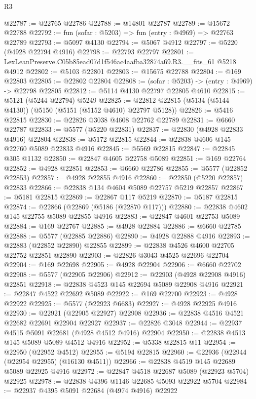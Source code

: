 \begin{lexlean}{R3}
\begin{coremodule}
@22787 := @22765 @22786
@22788 := @14801 @22787
@22789 := @15672 @22788
@22792 := fun (sofar : @5203) => fun (entry : @4969) => @22763 @22789
@22793 := @5097 @4130
@22794 := @5067 @4912
@22797 := @5220 (@4928 @22794 @4916)
@22798 := @22793 @22797
@22801 := LexLeanPreserve.C05b85ead07d1f546ac4aafba32874a69.R3.__fits_61 @5218 @4912
@22802 := @5103 @22801
@22803 := @15675 @22788
@22804 := @169 @22803
@22805 := @22802 @22804
@22808 := (sofar : @5203) -> (entry : @4969) -> @22798 @22805
@22812 := @5114 @4130 @22797 @22805 @4610
@22815 := @5121 (@5244 @22794) @5249
@22825 := @22812 @22815 (@5134 (@5144 @4130)) (@5150 (@5151 (@5152 @4610) @22797 @5128))
@22826 := @5416 @22815
@22830 := @22826 @3038 @4608 @22762 @22789
@22831 := @6660 @22787
@22833 := @5577 (@5220 @22831)
@22837 := @22830 (@4928 @22833 @4916) @22804
@22838 := @5172 @22815
@22844 := @22838 @4606 @145 @22760 @5089 @22833 @4916
@22845 := @5569 @22815
@22847 := @22845 @305 @1132
@22850 := @22847 @4605 @22758 @5089
@22851 := @169 @22764
@22852 := @4928 @22851
@22853 := @6660 @22786
@22855 := @5577 (@22852 @22853)
@22857 := @4928 @22855 @4916
@22860 := @22850 (@5220 @22857) @22833
@22866 := @22838 @134 @4604 @5089 @22757 @5219 @22857
@22867 := @5181 @22815
@22869 := @22867 @117 @5219
@22870 := @5187 @22815
@22874 := @22866 (@22869 (@5186 (@22870 @117)))
@22880 := @22838 @4602 @145 @22755 @5089 @22855 @4916
@22883 := @22847 @4601 @22753 @5089
@22884 := @169 @22767
@22885 := @4928 @22884
@22886 := @6660 @22785
@22888 := @5577 (@22885 @22886)
@22890 := @4928 @22888 @4916
@22893 := @22883 (@22852 @22890) @22855
@22899 := @22838 @4526 @4600 @22705 @22752 @22851 @22890
@22903 := @22826 @3043 @4525 @22696 @22704
@22904 := @169 @22698
@22905 := @4928 @22904
@22906 := @6660 @22702
@22908 := @5577 (@22905 @22906)
@22912 := @22903 (@4928 @22908 @4916) @22851
@22918 := @22838 @4523 @145 @22694 @5089 @22908 @4916
@22921 := @22847 @4522 @22692 @5089
@22922 := @169 @22700
@22923 := @4928 @22922
@22925 := @5577 (@22923 @6683)
@22927 := @4928 @22925 @4916
@22930 := @22921 (@22905 @22927) @22908
@22936 := @22838 @4516 @4521 @22682 @22691 @22904 @22927
@22937 := @22826 @3048
@22944 := @22937 @4515 @5091 @22681 (@4928 @4512 @4916) @22904
@22950 := @22838 @4513 @145 @5089 @5089 @4512 @4916
@22952 := @5338 @22815 @11
@22954 := @22950 (@22952 @4512)
@22955 := @5194 @22815
@22960 := @22936 (@22944 (@22954 @22955) (@16130 @4511))
@22966 := @22838 @4519 @145 @22689 @5089 @22925 @4916
@22972 := @22847 @4518 @22687 @5089 (@22923 @5704) @22925
@22978 := @22838 @4396 @1146 @22685 @5093 @22922 @5704
@22984 := @22937 @4395 @5091 @22684 (@4974 @4916) @22922

\end{coremodule}
\end{lexlean}
